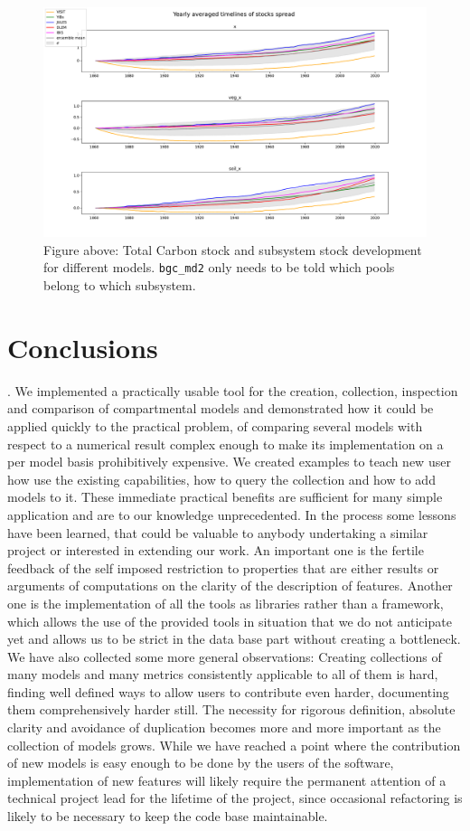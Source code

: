 \begin{figure}[t] \includegraphics[width=\columnwidth]{test_stock_mean.pdf}
  \caption{ Figure above: Total Carbon stock and subsystem stock development
  for different models.  \texttt{bgc\_md2} only needs to be told which pools
  belong to which subsystem.  } \label{fig:stock_mean} \end{figure}  


\section{Conclusions} \label{sec:ConclusionsAndOutlook}.  We implemented a
practically usable tool for the creation, collection, inspection and comparison
of compartmental models and demonstrated how it could be applied quickly to the
practical problem, of comparing several models with respect to a numerical
result complex enough to make its implementation on a per model basis
prohibitively expensive.  We created examples to teach new user how use the
existing capabilities, how to query the collection and how to add models to it.
These immediate practical benefits are sufficient for many simple application and
are to our knowledge unprecedented.  In the process some lessons have been
learned, that could be valuable to anybody undertaking a similar project or
interested in extending our work.  An important one is the fertile feedback of
the self imposed restriction to properties that are either results or arguments
of computations on the clarity of the description of features.  Another one is
the implementation of all the tools as libraries rather than a framework, which
allows the use of the provided tools in situation that we do not anticipate yet
and allows us to be strict in the data base part without creating a bottleneck.
We have also collected some more general observations: Creating collections of
many models and many metrics consistently applicable to all of them is hard,
finding well defined ways to allow users to contribute even harder, documenting
them comprehensively harder still.  The necessity for rigorous definition,
absolute clarity and avoidance of duplication becomes more and more important
as the collection of models grows.  While we have reached a point where the
contribution of new models is easy enough to be done by the users of the
software, implementation of new features will likely
require the permanent attention of a technical project lead for 
the lifetime of the project, since occasional refactoring is likely to be necessary
to keep the code base maintainable.

